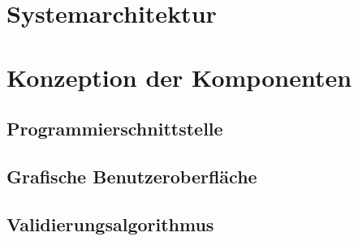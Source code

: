 \section{Systemarchitektur}

\section{Konzeption der Komponenten}

\subsection{Programmierschnittstelle}


\subsection{Grafische Benutzeroberfläche}



\subsection{Validierungsalgorithmus}